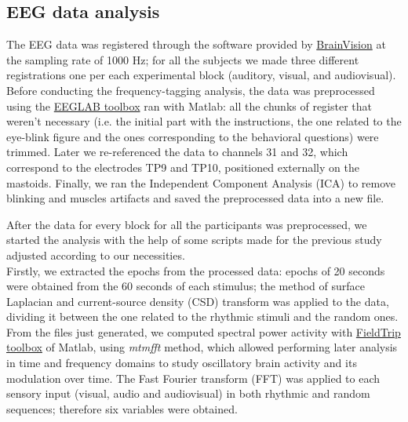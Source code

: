 \subsection{EEG data analysis}
The EEG data was registered through the software provided by \href{https://brainvision.com/applications/brain-vision-software/}{BrainVision} at the sampling rate of 1000 Hz; for all the subjects we made three different registrations one per each experimental block (auditory, visual, and audiovisual). \\
Before conducting the frequency-tagging analysis, the data was preprocessed using the \href{https://eeglab.org/}{EEGLAB toolbox} ran with Matlab: all the chunks of register that weren't necessary (i.e. the initial part with the instructions, the one related to the eye-blink figure and the ones corresponding to the behavioral questions) were trimmed. Later we re-referenced the data to channels 31 and 32, which correspond to the electrodes TP9 and TP10, positioned externally on the mastoids. Finally, we ran the Independent Component Analysis (ICA) to remove blinking and muscles artifacts and saved the preprocessed data into a new file. 

After the data for every block for all the participants was preprocessed, we started the analysis with the help of some scripts made for the previous study adjusted according to our necessities. \\
Firstly, we extracted the epochs from the processed data: epochs of 20 seconds were obtained from the 60 seconds of each stimulus; the method of surface Laplacian and current-source density (CSD) transform was applied to the data, dividing it between the one related to the rhythmic stimuli and the random ones. \\
From the files just generated, we computed spectral power activity with \href{https://www.fieldtriptoolbox.org/}{FieldTrip toolbox} of Matlab, using \textit{mtmfft} method, which allowed performing later analysis in time and frequency domains to study oscillatory brain activity and its modulation over time. The Fast Fourier transform (FFT) was applied to each sensory input (visual, audio and audiovisual) in both rhythmic and random sequences; therefore six variables were obtained. 


